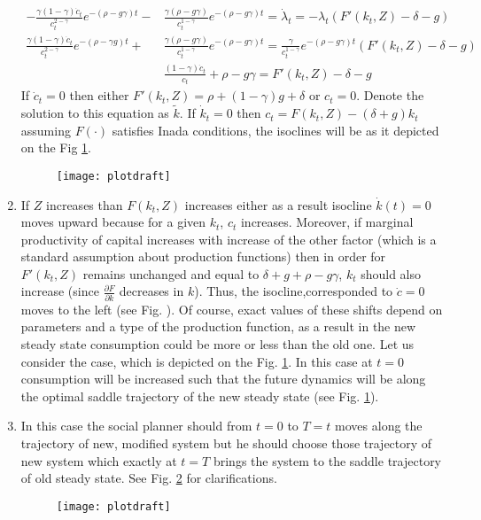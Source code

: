 \documentclass[a4paper]{article}
\begin{document}
\begin{enumerate}
\begin{align*}
	-\frac{\gamma(1 - \gamma)\dot{c}_t}{c_t^{2 - \gamma}}e^{-(\rho - g\gamma)t} - &\frac{\gamma(\rho - g\gamma)}{c_t^{1 - \gamma}}e^{-(\rho - g\gamma)t} = \dot{\lambda}_t = -\lambda_t(F'(k_t, Z) - \delta - g)\\
	\frac{\gamma(1 - \gamma)\dot{c}_t}{c_t^{2 - \gamma}}e^{-(\rho - \gamma g)t} + &\frac{\gamma(\rho - g\gamma)}{c_t^{1 - \gamma}}e^{-(\rho - g\gamma)t} = \frac{\gamma}{c_t^{1 - \gamma}}e^{-(\rho - g\gamma)t}(F'(k_t, Z) - \delta - g)\\
	&\frac{(1 - \gamma)\dot{c}_t}{c_t} + \rho - g\gamma = F'(k_t, Z) - \delta - g
	\end{align*}
	If $\dot{c}_t = 0$ then either $F'(k_t, Z) = \rho +(1-\gamma)g + \delta$ or $c_t = 0$. Denote the solution to this equation as $\tilde{k}$. If $\dot{k}_t = 0$ then $c_t = F(k_t, Z) - (\delta + g)k_t$ assuming $F(\cdot)$ satisfies Inada conditions, the isoclines will be as it depicted on the Fig \ref{fig1}. 
	\begin{figure}[h]
		\centering
		\texttt{[image: plotdraft]}
		\caption{}\label{fig1}
	\end{figure}
\item If $Z$ increases than $F(k_t, Z)$ increases either as a result isocline $\dot{k}(t) = 0$ moves upward because for a given $k_t$, $c_t$ increases. Moreover, if marginal productivity of capital increases with increase of the other factor (which is a standard assumption about production functions) then in order for $F'(k_t, Z)$ remains unchanged and equal to $\delta + g + \rho - g\gamma$, $k_t$ should also increase (since $\frac{\partial F}{\partial k}$ decreases in $k$). Thus, the isocline,corresponded to $\dot{c} = 0$ moves to the left (see Fig. ). Of course, exact values of these shifts depend on parameters and a type of the production function, as a result in the new steady state consumption could be more or less than the old one. Let us consider the case, which is depicted on the Fig. \ref{fig1}. In this case at $t = 0$ consumption will be increased such that the future dynamics will be along the optimal saddle trajectory of the new steady state (see Fig. \ref{fig1}).
\item In this case the social planner should from $t = 0$ to $T = t$ moves along the trajectory of new, modified system but he should choose those trajectory of new system which exactly at $t = T$ brings the system to the saddle trajectory of old steady state. See Fig. \ref{fig3} for clarifications.

	\begin{figure}[H]
	\centering
	\texttt{[image: plotdraft]}
	\caption{}\label{fig3}
\end{figure}

\end{enumerate}
\end{document}
